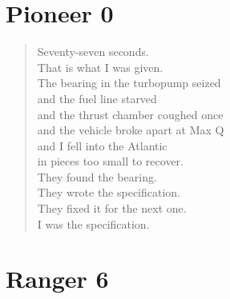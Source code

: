\documentclass[12pt]{article}
\begin{document}
\vspace{1.5em}

\section*{\textcolor{failure}{Pioneer 0}}

\begin{verse}
Seventy-seven seconds.\\
That is what I was given.\\
The bearing in the turbopump seized\\
and the fuel line starved\\
and the thrust chamber coughed once\\
and the vehicle broke apart at Max Q\\
and I fell into the Atlantic\\
in pieces too small to recover.\\
They found the bearing.\\
They wrote the specification.\\
They fixed it for the next one.\\
I was the specification.
\end{verse}

\vspace{1.5em}

\section*{\textcolor{failure}{Ranger 6}}
\end{document}
